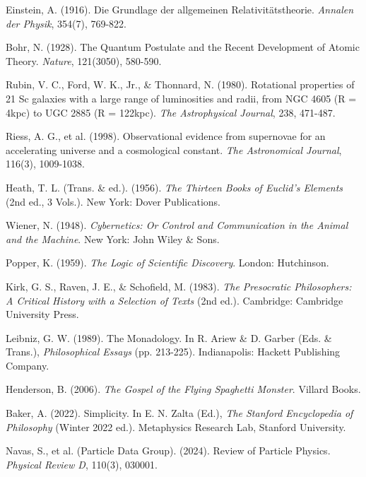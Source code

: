 \documentclass[pdflatex,sn-mathphys-num]{sn-jnl}
\begin{document}
\begin{thebibliography}{99}

Einstein, A. (1916). Die Grundlage der allgemeinen Relativitätstheorie. \textit{Annalen der Physik}, 354(7), 769-822.

Bohr, N. (1928). The Quantum Postulate and the Recent Development of Atomic Theory. \textit{Nature}, 121(3050), 580-590.

Rubin, V. C., Ford, W. K., Jr., \& Thonnard, N. (1980). Rotational properties of 21 Sc galaxies with a large range of luminosities and radii, from NGC 4605 (R = 4kpc) to UGC 2885 (R = 122kpc). \textit{The Astrophysical Journal}, 238, 471-487.

Riess, A. G., et al. (1998). Observational evidence from supernovae for an accelerating universe and a cosmological constant. \textit{The Astronomical Journal}, 116(3), 1009-1038.

Heath, T. L. (Trans. \& ed.). (1956). \textit{The Thirteen Books of Euclid's Elements} (2nd ed., 3 Vols.). New York: Dover Publications.

Wiener, N. (1948). \textit{Cybernetics: Or Control and Communication in the Animal and the Machine}. New York: John Wiley \& Sons.

Popper, K. (1959). \textit{The Logic of Scientific Discovery}. London: Hutchinson.

Kirk, G. S., Raven, J. E., \& Schofield, M. (1983). \textit{The Presocratic Philosophers: A Critical History with a Selection of Texts} (2nd ed.). Cambridge: Cambridge University Press.

Leibniz, G. W. (1989). The Monadology. In R. Ariew \& D. Garber (Eds. \& Trans.), \textit{Philosophical Essays} (pp. 213-225). Indianapolis: Hackett Publishing Company.

Henderson, B. (2006). \textit{The Gospel of the Flying Spaghetti Monster}. Villard Books.

Baker, A. (2022). Simplicity. In E. N. Zalta (Ed.), \textit{The Stanford Encyclopedia of Philosophy} (Winter 2022 ed.). Metaphysics Research Lab, Stanford University.

Navas, S., et al. (Particle Data Group). (2024). Review of Particle Physics. \textit{Physical Review D}, 110(3), 030001.


\end{thebibliography}
\end{document}
